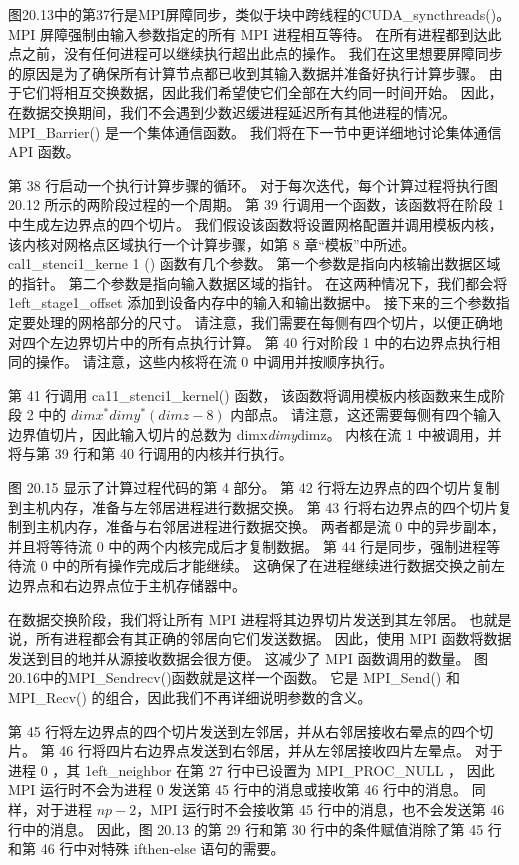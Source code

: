 图20.13中的第37行是MPI屏障同步，类似于块中跨线程的CUDA\_syncthreads()。 
MPI 屏障强制由输入参数指定的所有 MPI 进程相互等待。 在所有进程都到达此点之前，没有任何进程可以继续执行超出此点的操作。 
我们在这里想要屏障同步的原因是为了确保所有计算节点都已收到其输入数据并准备好执行计算步骤。 
由于它们将相互交换数据，因此我们希望使它们全部在大约同一时间开始。 
因此，在数据交换期间，我们不会遇到少数迟缓进程延迟所有其他进程的情况。 
MPI\_Barrier() 是一个集体通信函数。 我们将在下一节中更详细地讨论集体通信 API 函数。

第 38 行启动一个执行计算步骤的循环。 对于每次迭代，每个计算过程将执行图 20.12 所示的两阶段过程的一个周期。 
第 39 行调用一个函数，该函数将在阶段 1 中生成左边界点的四个切片。 
我们假设该函数将设置网格配置并调用模板内核，该内核对网格点区域执行一个计算步骤，如第 8 章“模板”中所述。 
cal1\_stenci1\_kerne 1 () 函数有几个参数。 
第一个参数是指向内核输出数据区域的指针。 第二个参数是指向输入数据区域的指针。 
在这两种情况下，我们都会将 1eft\_stage1\_offset 添加到设备内存中的输入和输出数据中。 
接下来的三个参数指定要处理的网格部分的尺寸。 
请注意，我们需要在每侧有四个切片，以便正确地对四个左边界切片中的所有点执行计算。 
第 40 行对阶段 1 中的右边界点执行相同的操作。 请注意，这些内核将在流 0 中调用并按顺序执行。

第 41 行调用 ca11\_stenci1\_kernel() 函数，
该函数将调用模板内核函数来生成阶段 2 中的 $d i m x^{*} d i m y^{*}(d i m z-8)$ 内部点。 
请注意，这还需要每侧有四个输入边界值切片，因此输入切片的总数为 dimx\textit{dimy}dimz。 
内核在流 1 中被调用，并将与第 39 行和第 40 行调用的内核并行执行。

图 20.15 显示了计算过程代码的第 4 部分。 第 42 行将左边界点的四个切片复制到主机内存，准备与左邻居进程进行数据交换。 
第 43 行将右边界点的四个切片复制到主机内存，准备与右邻居进程进行数据交换。 
两者都是流 0 中的异步副本，并且将等待流 0 中的两个内核完成后才复制数据。 
第 44 行是同步，强制进程等待流 0 中的所有操作完成后才能继续。 
这确保了在进程继续进行数据交换之前左边界点和右边界点位于主机存储器中。

在数据交换阶段，我们将让所有 MPI 进程将其边界切片发送到其左邻居。 也就是说，所有进程都会有其正确的邻居向它们发送数据。 
因此，使用 MPI 函数将数据发送到目的地并从源接收数据会很方便。 这减少了 MPI 函数调用的数量。 
图20.16中的MPI\_Sendrecv()函数就是这样一个函数。 
它是 MPI\_Send() 和 MPI\_Recv() 的组合，因此我们不再详细说明参数的含义。

第 45 行将左边界点的四个切片发送到左邻居，并从右邻居接收右晕点的四个切片。 
第 46 行将四片右边界点发送到右邻居，并从左邻居接收四片左晕点。 
对于进程 0 ，其 1eft\_neighbor 在第 27 行中已设置为 MPI\_PROC\_NULL ，
因此 MPI 运行时不会为进程 0 发送第 45 行中的消息或接收第 46 行中的消息。 
同样，对于进程 $n p-2$，MPI 运行时不会接收第 45 行中的消息，也不会发送第 46 行中的消息。 
因此，图 20.13 的第 29 行和第 30 行中的条件赋值消除了第 45 行和第 46 行中对特殊 ifthen-else 语句的需要。

